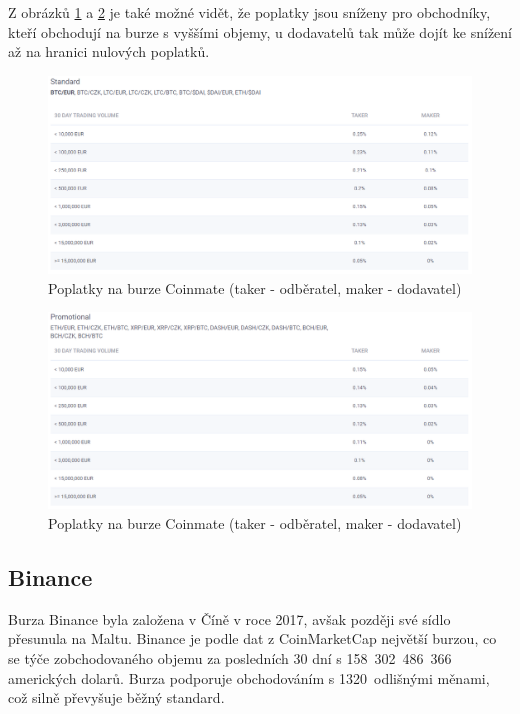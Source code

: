 \documentclass[thesis=B,czech]{FITthesis}[2019/03/21]
\begin{document}
Z obrázků \ref{coinmate_standard} a \ref{coinmate_promotional} je také možné vidět, že poplatky jsou sníženy pro obchodníky, kteří obchodují na burze s vyššími objemy, u dodavatelů tak může dojít ke snížení až na hranici nulových poplatků. \cite{coinmate_fees}

\begin{figure}\centering
	\includegraphics[width=1\textwidth]{images/coinmate_standard.PNG}
	\caption{Poplatky na burze Coinmate (taker - odběratel, maker - dodavatel) \cite{coinmate_fees}}\label{coinmate_standard}
\end{figure}
\begin{figure}\centering
	\includegraphics[width=1\textwidth]{images/coinmate_promotional.PNG}
	\caption{Poplatky na burze Coinmate (taker - odběratel, maker - dodavatel) \cite{coinmate_fees}}\label{coinmate_promotional}
\end{figure}
\subsection{Binance}
Burza Binance byla založena v Číně v roce 2017, avšak později své sídlo přesunula na Maltu. Binance je podle dat z CoinMarketCap největší burzou, co se týče zobchodovaného objemu za posledních 30 dní s 158~302~486~366 amerických dolarů. \cite{coinmarketcap} Burza podporuje obchodováním s 1320~odlišnými měnami, což silně převyšuje běžný standard.
\end{document}
